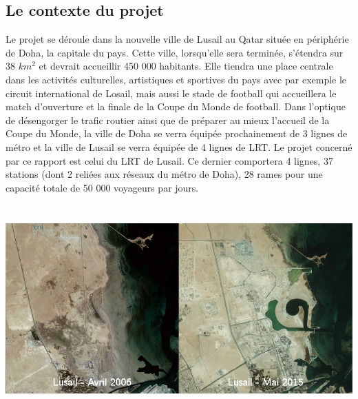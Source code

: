 \subsection{Le contexte du projet} Le projet se déroule dans la nouvelle ville de Lusail au Qatar située en périphérie de Doha, la capitale du pays. Cette ville, lorsqu'elle sera terminée, s'étendra sur 38 \begin{math} km^2 \end{math} et devrait accueillir 450 000 habitants. Elle tiendra une place centrale dans les activités culturelles, artistiques et sportives du pays avec par exemple le circuit international de Losail, mais aussi le stade de football qui accueillera le match d'ouverture et la finale de la Coupe du Monde de football. Dans l'optique de désengorger le trafic routier ainsi que de préparer au mieux l'accueil de la Coupe du Monde, la ville de Doha se verra équipée prochainement de 3 lignes de métro et la ville de Lusail se verra équipée de 4 lignes de LRT. Le projet concerné par ce rapport est celui du LRT de Lusail. Ce dernier comportera 4 lignes, 37 stations (dont 2 reliées aux réseaux du métro de Doha), 28 rames pour une capacité totale de 50 000 voyageurs par jours.

\begin{center}
\includegraphics[height=8cm]{ressources/images/figures/Lusail.png}
\end{center}

